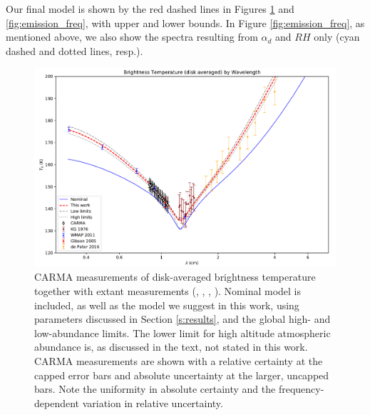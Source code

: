 \documentclass{article}
\begin{document}
	Our final model is shown by the red dashed lines in Figures \ref{fig:emission_wl} and \ref{fig:emission_freq}, with upper and lower bounds.
	In Figure \ref{fig:emission_freq}, as mentioned above, we also show the spectra resulting from $\alpha_{d}$ and $RH$ only (cyan dashed and dotted lines, resp.).

	\begin{figure}
		\centering
		\includegraphics[width=\textwidth]{final_models_wl.pdf}
		\caption{\label{fig:emission_wl}CARMA measurements of disk-averaged brightness temperature together with extant measurements (\citealt{1978Icar...35...44K}, \citealt{2011ApJS..192...19W}, \citealt{2005Icar..173..439G}, \citealt{2016AGUFM.P31D..08D}). Nominal model is included, as well as the model we suggest in this work, using parameters discussed in Section \ref{s:results}, and the global high- and low-abundance limits. The lower limit for high altitude atmospheric abundance is, as discussed in the text, not stated in this work. CARMA measurements are shown with a relative certainty at the capped error bars and absolute uncertainty at the larger, uncapped bars. Note the uniformity in absolute certainty and the frequency-dependent variation in relative uncertainty.}
	\end{figure}
\end{document}
